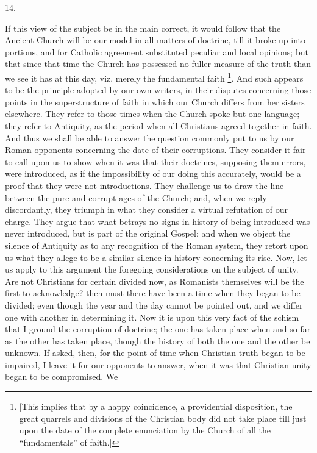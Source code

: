 14.

If this view of the subject be in the main correct, it would follow
that the Ancient Church will be our model in all matters of doctrine,
till it broke up into portions, and for Catholic agreement substituted
peculiar and local opinions; but that since that time the Church has
possessed no fuller measure of the truth than we see it has at this
day, viz. merely the fundamental faith \footnote{[This implies that by a happy coincidence, a
providential disposition, the great quarrels and divisions of the
Christian body did not take place till just upon the date of the
complete enunciation by the Church of all the ``fundamentals'' of
faith.]}. And such appears to be the principle adopted by our own
writers, in their disputes concerning those points in the
superstructure of faith in which our Church differs from her sisters
elsewhere. They refer to those times when the Church spoke but one
language; they refer to Antiquity, as the period when all Christians
agreed together in faith. And thus we shall be able to answer the
question commonly put to us by our Roman opponents concerning the date
of their corruptions. They consider it fair to call upon us to show
when it was that their doctrines, supposing them errors, were
introduced, as if the impossibility of our doing this accurately,
would be a proof that they were not introductions. They challenge us
to draw the line between the pure and corrupt ages of the Church; and,
when we reply discordantly, they triumph in what they consider a
virtual refutation of our charge. They argue that what betrays no
signs in history of being introduced was never introduced, but is part
of the original Gospel; and when we object the silence of Antiquity as
to any recognition of the Roman system, they retort upon us what they
allege to be a similar silence in history concerning its rise. Now,
let us apply to this argument the foregoing considerations on the
subject of unity. Are not Christians for certain divided now, as
Romanists themselves will be the first to acknowledge? then must there
have been a time when they began to be divided; even though the year
and the day cannot be pointed out, and we differ one with another in
determining it. Now it is upon this very fact of the schism that I
ground the corruption of doctrine; the one has taken place when and so
far as the other has taken place, though the history of both the one
and the other be unknown. If asked, then, for the point of time when
Christian truth began to be impaired, I leave it for our opponents to
answer, when it was that Christian unity began to be compromised. We
